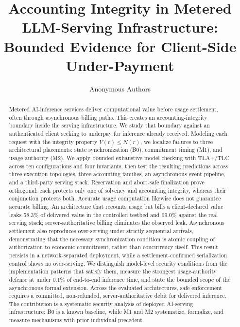 \documentclass[manuscript,review,anonymous]{acmart}
\begin{document}
\title{Accounting Integrity in Metered LLM-Serving Infrastructure:
Bounded Evidence for Client-Side Under-Payment}

\author{Anonymous Authors}

\begin{abstract}
Metered AI-inference services deliver computational value before usage settlement, often
through asynchronous billing paths. This creates an accounting-integrity boundary inside
the serving infrastructure. We study that boundary against an authenticated client seeking
to underpay for inference already received. Modeling each request with the integrity
property $V(r) \le N(r)$, we localize failures to three architectural placements: state
synchronization (B0), commitment timing (M1), and usage authority (M2). We apply
bounded exhaustive model checking with TLA+/TLC across ten configurations and four invariants, then
test the resulting predictions across three execution topologies, three accounting
families, an asynchronous event pipeline, and a third-party serving stack. Reservation and
abort-safe finalization prove orthogonal: each protects only one of solvency and accounting
integrity, whereas their conjunction protects both. Accurate usage computation likewise
does not guarantee accurate billing. An architecture that recounts usage but bills a
client-declared value leaks 58.3\% of delivered value in the controlled testbed and 69.0\%
against the real serving stack; server-authoritative billing eliminates the observed leak.
Asynchronous settlement also reproduces over-serving under strictly sequential arrivals,
demonstrating that the necessary synchronization condition is atomic coupling of
authorization to economic commitment, rather than concurrency itself. This result persists
in a network-separated deployment, while a settlement-confirmed serialization control shows
no over-serving. We distinguish model-level security conditions from the implementation
patterns that satisfy them, measure the strongest usage-authority defense at under 0.1\% of
end-to-end inference time, and state the bounded scope of the asynchronous formal extension.
Across the evaluated architectures, safe enforcement requires a committed, non-refunded,
server-authoritative debit for delivered inference. The contribution is a systematic
security analysis of deployed AI-serving infrastructure: B0 is a known baseline, while M1
and M2 systematize, formalize, and measure mechanisms with prior individual precedent.
\end{abstract}
\end{document}
